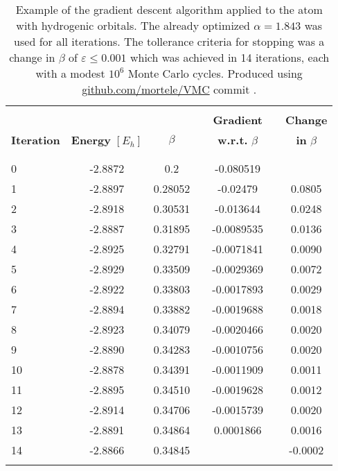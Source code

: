 \documentclass[../../master.tex]{subfiles}
\begin{document}
\begin{table}
\centering{}
\setlength\extrarowheight{2pt}
\begin{tabularx}{\textwidth}{X *{6}{S[table-format=-1.3,table-space-text-post=***]}}
\hline
\hline
\\[-0.9em]
                   &                          &          &  & \textbf{Gradient}        & & \textbf{Change}\\
\textbf{Iteration} & \textbf{Energy} $[E_h]$  &  $\beta$ &  & \phantom{-}\textbf{w.r.t. } $\beta$ & & \phantom{-}\textbf{in } $\beta$\\
\\[-0.9em]
\hline
\\[-0.9em]
     0   &   -2.8872   &       0.2 & & -0.080519  &  &         \\
     1   &   -2.8897   &   0.28052 & & -0.02479  &   & 0.0805 \\
     2   &   -2.8918   &   0.30531 & & -0.013644  &  &  0.0248 \\
     3   &   -2.8887   &   0.31895 & & -0.0089535  & &   0.0136 \\
     4   &   -2.8925   &   0.32791 & & -0.0071841  & &   0.0090 \\
     5   &   -2.8929   &   0.33509 & & -0.0029369  & &   0.0072 \\
     6   &   -2.8922   &   0.33803 & & -0.0017893  & &   0.0029 \\
     7   &   -2.8894   &   0.33882 & & -0.0019688  & &   0.0018 \\
     8   &   -2.8923   &   0.34079 & & -0.0020466  & &   0.0020 \\
     9   &   -2.8890   &   0.34283 & & -0.0010756  & &   0.0020 \\
    10   &   -2.8878   &   0.34391 & & -0.0011909  & &   0.0011 \\
    11   &   -2.8895   &   0.34510 & & -0.0019628  & &   0.0012 \\
    12   &   -2.8914   &   0.34706 & & -0.0015739  & &   0.0020 \\
    13   &   -2.8891   &   0.34864 & &  0.0001866  & &   0.0016 \\ 
    14   &   -2.8866   &   0.34845 & &   & &  -0.0002 \\
    \\[-0.9em]
\hline
\end{tabularx}
\caption{Example of the gradient descent algorithm applied to the  atom with hydrogenic orbitals. The already optimized $\alpha=1.843$ was used for all iterations. The tollerance criteria for stopping was a change in $\beta$ of $\varepsilon\le0.001$ which was achieved in 14 iterations, each with a modest $10^6$ Monte Carlo cycles. Produced using \url{github.com/mortele/VMC} commit . \label{tab:gradd}}
\end{table}
\end{document}
